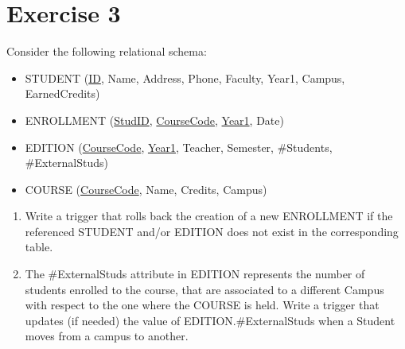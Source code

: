 \section{Exercise 3}

Consider the following relational schema:
\begin{itemize}
    \item STUDENT (\underline{ID}, Name, Address, Phone, Faculty, Year1, Campus, EarnedCredits)
    \item ENROLLMENT (\underline{StudID}, \underline{CourseCode}, \underline{Year1}, Date)
    \item EDITION (\underline{CourseCode}, \underline{Year1}, Teacher, Semester, \#Students, \#ExternalStuds)
    \item COURSE (\underline{CourseCode}, Name, Credits, Campus)
\end{itemize}
\begin{enumerate}
    \item Write a trigger that rolls back the creation of a new ENROLLMENT if the referenced STUDENT and/or EDITION does not exist in the corresponding table. 
    \item The \#ExternalStuds attribute in EDITION represents the number of students enrolled to the course, that are associated to a different Campus with respect to the one where the COURSE is held.
        Write a trigger that updates (if needed) the value of EDITION.\#ExternalStuds when a Student moves from a campus to another.
\end{enumerate}

